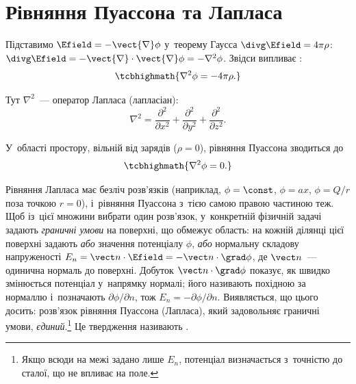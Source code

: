 \section{Рівняння Пуассона та Лапласа}\label{sec:Uniqueness}\hypertarget{poisson-laplace-equations}{}

Підставимо $\Efield = - \vect{\nabla}\phi$ у~теорему Гаусса $\divg\Efield = 4\pi\rho$:
$\divg\Efield = -\vect{\nabla}\cdot\vect{\nabla}\phi = -\nabla^2\phi$. Звідси випливає
:
\begin{equation}\label{eq:Puasson}
	\tcbhighmath{
		\nabla^2\phi = - 4\pi\rho.
	}
\end{equation}

Тут $\nabla^2$~--- оператор Лапласа (лапласіан):
\begin{equation*}
	\nabla^2 = \frac{\partial^2}{\partial x^2} +
	\frac{\partial^2}{\partial y^2} + \frac{\partial^2}{\partial z^2}.
\end{equation*}

У~області простору, вільній від зарядів ($\rho = 0$), рівняння Пуассона зводиться до
\begin{equation}\label{eq:Laplase}
	\tcbhighmath{
		\nabla^2\phi = 0.
	}
\end{equation}

Рівняння Лапласа має безліч розв'язків (наприклад, $\phi = \const$, $\phi = ax$,
$\phi = Q/r$ поза точкою $r = 0$), і~рівняння Пуассона з~тією самою правою частиною теж.
Щоб із~цієї множини вибрати один розв'язок, у~конкретній фізичній задачі задають
\emph{граничні умови} на поверхні, що обмежує область: на кожній ділянці цієї поверхні
задають \emph{або} значення потенціалу $\phi$, \emph{або} нормальну складову напруженості
$E_n = \vect n\cdot\Efield = -\vect n\cdot\grad\phi$, де $\vect n$~--- одинична нормаль до
поверхні. Добуток $\vect n\cdot\grad\phi$ показує, як швидко змінюється потенціал
у~напрямку нормалі; його називають похідною за нормаллю і~позначають
$\partial\phi/\partial n$, тож $E_n = -\partial\phi/\partial n$. Виявляється, що цього досить: розв'язок рівняння
Пуассона (Лапласа), який задовольняє граничні умови, \emph{єдиний}.\footnote{Якщо всюди на
	межі задано лише $E_n$, потенціал визначається з~точністю до сталої, що не впливає на
	поле.} Це твердження називають .

